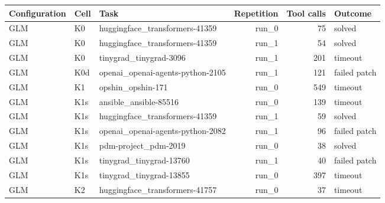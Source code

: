 \begin{tabular}{@{}llp{5.4cm}rrl@{}}
  \toprule
  Configuration & Cell & Task & Repetition & Tool calls & Outcome \\
  \midrule
  GLM & K0 & huggingface\_transformers-41359 & run\_0 & 75 & solved \\
  \rowcolor{black!6} GLM & K0 & huggingface\_transformers-41359 & run\_1 & 54 & solved \\
  GLM & K0 & tinygrad\_tinygrad-3096 & run\_1 & 201 & timeout \\
  \rowcolor{black!6} GLM & K0d & openai\_openai-agents-python-2105 & run\_1 & 121 & failed patch \\
  GLM & K1 & opshin\_opshin-171 & run\_0 & 549 & timeout \\
  \rowcolor{black!6} GLM & K1s & ansible\_ansible-85516 & run\_0 & 139 & timeout \\
  GLM & K1s & huggingface\_transformers-41359 & run\_1 & 59 & solved \\
  \rowcolor{black!6} GLM & K1s & openai\_openai-agents-python-2082 & run\_1 & 96 & failed patch \\
  GLM & K1s & pdm-project\_pdm-2019 & run\_0 & 38 & solved \\
  \rowcolor{black!6} GLM & K1s & tinygrad\_tinygrad-13760 & run\_1 & 40 & failed patch \\
  GLM & K1s & tinygrad\_tinygrad-13855 & run\_0 & 397 & timeout \\
  \rowcolor{black!6} GLM & K2 & huggingface\_transformers-41757 & run\_0 & 37 & timeout \\
  \bottomrule
\end{tabular}
